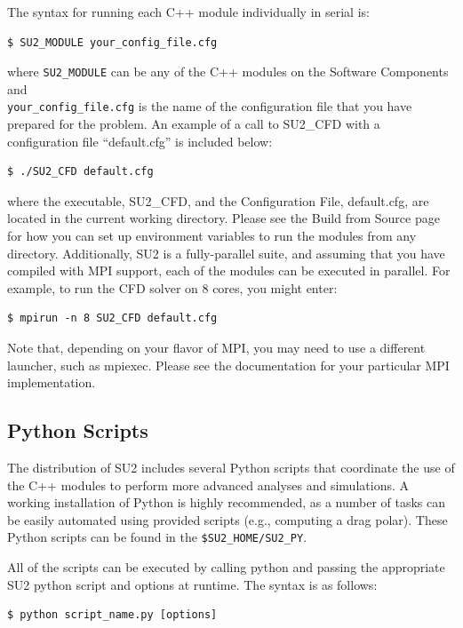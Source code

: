 \documentclass{article}
\begin{document}
The syntax for running each C++ module individually in serial is:

\begin{lstlisting}
$ SU2_MODULE your_config_file.cfg
\end{lstlisting}


where \verb|SU2_MODULE| can be any of the C++ modules on the Software Components and \\ \verb|your_config_file.cfg| is the name of the configuration file that you have prepared for the problem. An example of a call to SU2\_CFD with a configuration file “default.cfg” is included below:

\begin{lstlisting}
$ ./SU2_CFD default.cfg
\end{lstlisting}


where the executable, SU2\_CFD, and the Configuration File, default.cfg, are located in the current working directory. Please see the Build from Source page for how you can set up environment variables to run the modules from any directory. Additionally, SU2 is a fully-parallel suite, and assuming that you have compiled with MPI support, each of the modules can be executed in parallel. For example, to run the CFD solver on 8 cores, you might enter:

\begin{lstlisting}
$ mpirun -n 8 SU2_CFD default.cfg
\end{lstlisting}


Note that, depending on your flavor of MPI, you may need to use a different launcher, such as mpiexec. Please see the documentation for your particular MPI implementation.

\subsection{Python Scripts}

The distribution of SU2 includes several Python scripts that coordinate the use of the C++ modules to perform more advanced analyses and simulations. A working installation of Python is highly recommended, as a number of tasks can be easily automated using provided scripts (e.g., computing a drag polar). These Python scripts can be found in the \verb|$SU2_HOME/SU2_PY|.

All of the scripts can be executed by calling python and passing the appropriate SU2 python script and options at runtime. The syntax is as follows:
\begin{lstlisting}
$ python script_name.py [options]
\end{lstlisting}
\end{document}
